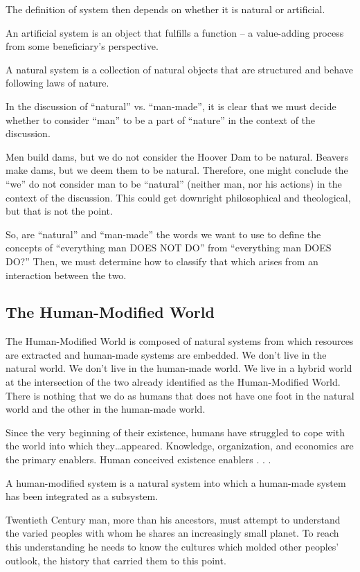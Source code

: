 The definition of system then depends on whether it is natural or artificial.

An artificial system is an object that fulfills a function – a value-adding process from some beneficiary’s perspective.

A natural system is a collection of natural objects that are structured and behave following laws of nature.

In the discussion of “natural” vs. “man-made”, it is clear that we must decide whether to consider “man” to be a part of “nature” in the context of the discussion.

Men build dams, but we do not consider the Hoover Dam to be natural. Beavers make dams, but we deem them to be natural. Therefore, one might conclude the “we” do not consider man to be “natural” (neither man, nor his actions) in the context of the discussion. This could get downright philosophical and theological, but that is not the point.

So, are “natural” and “man-made” the words we want to use to define the concepts of “everything man DOES NOT DO” from “everything man DOES DO?”  Then, we must determine how to classify that which arises from an interaction between the two.
    
\subsection{The Human-Modified World}\label{subsec:humanModifiedWorld}

The Human-Modified World is composed of natural systems from which resources are extracted and human-made systems are embedded. We don’t live in the natural world. We don’t live in the human-made world. We live in a hybrid world at the intersection of the two already identified as the Human-Modified World. There is nothing that we do as humans that does not have one foot in the natural world and the other in the human-made world.

Since the very beginning of their existence, humans have struggled to cope with the world into which they…appeared. Knowledge, organization, and economics are the primary enablers. Human conceived existence enablers . . . 

A human-modified system is a natural system into which a human-made system has been integrated as a subsystem.

Twentieth Century man, more than his ancestors, must attempt to understand the varied peoples with whom he shares an increasingly small planet. To reach this understanding he needs to know the cultures which molded other peoples’ outlook, the history that carried them to this point.

